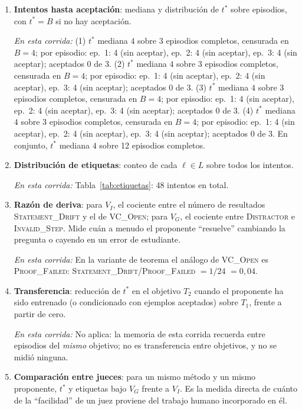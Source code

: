 \documentclass[11pt,a4paper]{article}
\begin{document}
\begin{enumerate}

  \item \textbf{Intentos hasta aceptación}: mediana y distribución de $t^*$ sobre episodios, con $t^* = B$ si no hay aceptación.

  \emph{En esta corrida:} (1) $t^*$ mediana $4$ sobre 3 episodios completos, censurada en $B = 4$; por episodio: ep.~1: 4 (sin aceptar), ep.~2: 4 (sin aceptar), ep.~3: 4 (sin aceptar); aceptados 0 de 3. (2) $t^*$ mediana $4$ sobre 3 episodios completos, censurada en $B = 4$; por episodio: ep.~1: 4 (sin aceptar), ep.~2: 4 (sin aceptar), ep.~3: 4 (sin aceptar); aceptados 0 de 3. (3) $t^*$ mediana $4$ sobre 3 episodios completos, censurada en $B = 4$; por episodio: ep.~1: 4 (sin aceptar), ep.~2: 4 (sin aceptar), ep.~3: 4 (sin aceptar); aceptados 0 de 3. (4) $t^*$ mediana $4$ sobre 3 episodios completos, censurada en $B = 4$; por episodio: ep.~1: 4 (sin aceptar), ep.~2: 4 (sin aceptar), ep.~3: 4 (sin aceptar); aceptados 0 de 3. En conjunto, $t^*$ mediana $4$ sobre 12 episodios completos.

  \item \textbf{Distribución de etiquetas}: conteo de cada $\ell \in L$ sobre todos los intentos.

  \emph{En esta corrida:} Tabla~\ref{tab:etiquetas}: 48 intentos en total.

  \item \textbf{Razón de deriva}: para $V_I$, el cociente entre el número de resultados \textsc{Statement\_Drift} y el de \textsc{VC\_Open}; para $V_G$, el cociente entre \textsc{Distractor} e \textsc{Invalid\_Step}. Mide cuán a menudo el proponente ``resuelve'' cambiando la pregunta o cayendo en un error de estudiante.

  \emph{En esta corrida:} En la variante de teorema el análogo de \textsc{VC\_Open} es \textsc{Proof\_Failed}: \textsc{Statement\_Drift}/\textsc{Proof\_Failed} $= 1/24$ $= 0{,}04$.

  \item \textbf{Transferencia}: reducción de $t^*$ en el objetivo $T_2$ cuando el proponente ha sido entrenado (o condicionado con ejemplos aceptados) sobre $T_1$, frente a partir de cero.

  \emph{En esta corrida:} No aplica: la memoria de esta corrida recuerda entre episodios del \emph{mismo} objetivo; no es transferencia entre objetivos, y no se midió ninguna.

  \item \textbf{Comparación entre jueces}: para un mismo método y un mismo proponente, $t^*$ y etiquetas bajo $V_G$ frente a $V_I$. Es la medida directa de cuánto de la ``facilidad'' de un juez proviene del trabajo humano incorporado en él.


\end{enumerate}
\end{document}
